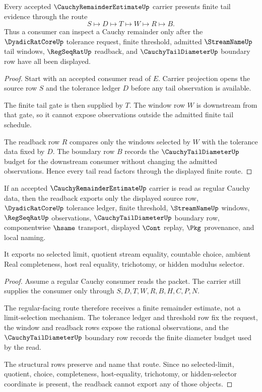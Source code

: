 \begin{theorem}
\label{thm:cauchy-remainder-estimate-dyadic-tail-bound-admission}
Every accepted $\CauchyRemainderEstimateUp$ carrier presents finite tail evidence through the route
$$
S \longmapsto D \longmapsto T \longmapsto W \longmapsto R \longmapsto B .
$$
Thus a consumer can inspect a Cauchy remainder only after the $\DyadicRatCoreUp$ tolerance request, finite threshold, admitted $\StreamNameUp$ tail windows, $\RegSeqRatUp$ readback, and $\CauchyTailDiameterUp$ boundary row have all been displayed.
\end{theorem}
\begin{proof}
Start with an accepted consumer read of $E$. Carrier projection opens the source row $S$ and the tolerance ledger $D$ before any tail observation is available.

The finite tail gate is then supplied by $T$. The window row $W$ is downstream from that gate, so it cannot expose observations outside the admitted finite tail schedule.

The readback row $R$ compares only the windows selected by $W$ with the tolerance data fixed by $D$. The boundary row $B$ records the $\CauchyTailDiameterUp$ budget for the downstream consumer without changing the admitted observations. Hence every tail read factors through the displayed finite route.
\end{proof}

\begin{theorem}
\label{thm:cauchy-remainder-estimate-regular-cauchy-readback}
If an accepted $\CauchyRemainderEstimateUp$ carrier is read as regular Cauchy data, then the readback exports only the displayed source row, $\DyadicRatCoreUp$ tolerance ledger, finite threshold, $\StreamNameUp$ windows, $\RegSeqRatUp$ observations, $\CauchyTailDiameterUp$ boundary row, componentwise $\hsame$ transport, displayed $\Cont$ replay, $\Pkg$ provenance, and local naming.

It exports no selected limit, quotient stream equality, countable choice, ambient Real completeness, host real equality, trichotomy, or hidden modulus selector.
\end{theorem}
\begin{proof}
Assume a regular Cauchy consumer reads the packet. The carrier still supplies the consumer only through $S,D,T,W,R,B,H,C,P,N$.

The regular-facing route therefore receives a finite remainder estimate, not a limit-selection mechanism. The tolerance ledger and threshold row fix the request, the window and readback rows expose the rational observations, and the $\CauchyTailDiameterUp$ boundary row records the finite diameter budget used by the read.

The structural rows preserve and name that route. Since no selected-limit, quotient, choice, completeness, host-equality, trichotomy, or hidden-selector coordinate is present, the readback cannot export any of those objects.
\end{proof}

